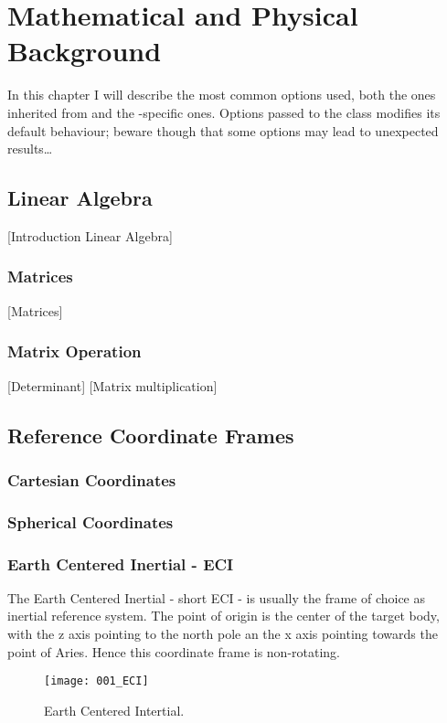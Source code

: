 \setchapterpreamble[u]{\margintoc}
\chapter{Mathematical and Physical Background}

In this chapter I will describe the most common options used, both the 
ones inherited from  and the -specific ones. 
Options passed to the class modifies its default behaviour; beware 
though that some options may lead to unexpected results\ldots

\section{Linear Algebra}

	[Introduction Linear Algebra]
	\subsection{Matrices}
		[Matrices]
	\subsection{Matrix Operation}
		[Determinant]
		[Matrix multiplication]

\section{Reference Coordinate Frames }
\subsection{Cartesian Coordinates}
\subsection{Spherical Coordinates}

\subsection{Earth Centered Inertial - ECI}

The Earth Centered Inertial - short ECI - is usually the frame of choice as inertial reference system. The point of origin is the center of the target body, with the z axis pointing to the north pole an the x axis pointing towards the point of Aries. Hence this coordinate frame is non-rotating. 
\begin{figure}[h!]
	\texttt{[image: 001\_ECI]}
	\caption[Earth Centered Intertial]{Earth Centered Intertial. }
\end{figure}


